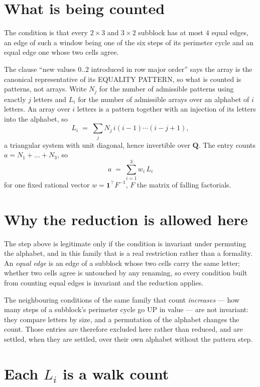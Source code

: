 \documentclass[11pt,a4paper]{article}
\theoremstyle{plain}
\theoremstyle{definition}
\begin{document}
\section{What is being counted}

The condition is that every $2\times3$ and $3\times2$ subblock has at most $4$ equal edges, an edge of such a window being one of the six steps of its perimeter cycle and an equal edge one whose two cells agree.

The clause ``new values $0..2$ introduced in row major order'' says the array is the
canonical representative of its EQUALITY PATTERN, so what is counted is patterns, not arrays.
Write $N_j$ for the number of admissible patterns using exactly $j$ letters and $L_i$ for the
number of admissible arrays over an alphabet of $i$ letters. An array over $i$ letters is a
pattern together with an injection of its letters into the alphabet, so
\[
L_i\;=\;\sum_j N_j\,i(i-1)\cdots(i-j+1),
\]
a triangular system with unit diagonal, hence invertible over $\mathbf{Q}$. The entry counts
$a=N_1+\dots+N_{3}$, so
\[
a\;=\;\sum_{i=1}^{3}w_i\,L_i
\]
for one fixed rational vector $w=\mathbf{1}^{\!\top}F^{-1}$, $F$ the matrix of falling
factorials.

\section{Why the reduction is allowed here}

The step above is legitimate only if the condition is invariant under permuting the alphabet,
and in this family that is a real restriction rather than a formality. An \emph{equal edge}
is an edge of a subblock whose two cells carry the same letter; whether two cells agree is
untouched by any renaming, so every condition built from counting equal edges is invariant and
the reduction applies.

The neighbouring conditions of the same family that count \emph{increases} --- how many steps
of a subblock's perimeter cycle go UP in value --- are not invariant: they compare letters by
size, and a permutation of the alphabet changes the count. Those entries are therefore excluded
here rather than reduced, and are settled, when they are settled, over their own alphabet
without the pattern step.

\section{Each $L_i$ is a walk count}
\end{document}
